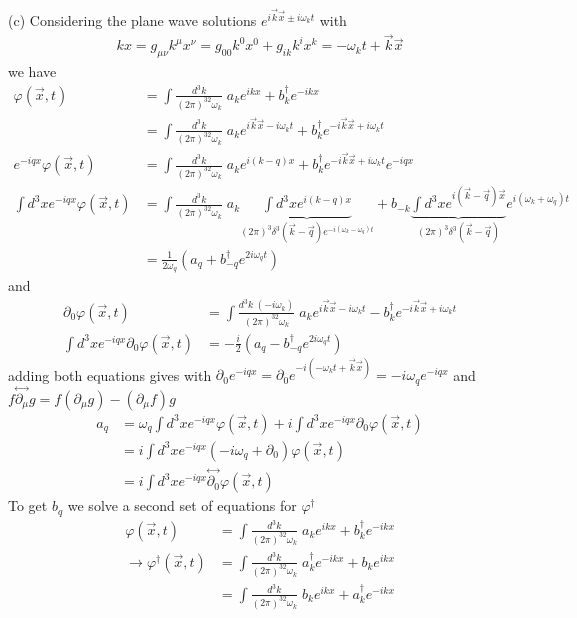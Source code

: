 \documentclass[10pt,a4paper]{article}
\theoremstyle{definition}
\begin{document}
(c) Considering the plane wave solutions $e^{i\vec{k}\vec{x}\pm i\omega_kt}$ with 
\begin{align}
kx=g_{\mu\nu}k^\mu x^\nu=g_{00}k^0x^0+g_{ik}k^ix^k=-\omega_kt+\vec{k}\vec{x}
\end{align}
we have
\begin{align}
\varphi(\vec{x},t)
&=\int\frac{d^3k}{(2\pi)^32\omega_k}\;a_ke^{ikx}+b^\dagger_ke^{-ikx}\\
&=\int\frac{d^3k}{(2\pi)^32\omega_k}\;a_ke^{i\vec{k}\vec{x}-i\omega_kt}+b^\dagger_ke^{-i\vec{k}\vec{x}+i\omega_kt}\\
e^{-iqx}\varphi(\vec{x},t)&=\int\frac{d^3k}{(2\pi)^32\omega_k}\;a_ke^{i(k-q)x}+b^\dagger_ke^{-i\vec{k}\vec{x}+i\omega_kt}e^{-iqx}\\
\int d^3xe^{-iqx}\varphi(\vec{x},t)
&=\int\frac{d^3k}{(2\pi)^32\omega_k} \;a_k\underbrace{\int d^3xe^{i(k-q)x}}_{(2\pi)^3\delta^3(\vec{k}-\vec{q})e^{-i(\omega_k-\omega_q)t}}+b_{-k}\underbrace{\int d^3xe^{i(\vec{k}-\vec{q})\vec{x}}}_{(2\pi)^3\delta^3(\vec{k}-\vec{q})}e^{i(\omega_k+\omega_q)t}\\
&=\frac{1}{2\omega_q}\left(a_q+b^\dagger_{-q}e^{2i\omega_qt}\right)
\end{align}
and
\begin{align}
\partial_0\varphi(\vec{x},t)&=\int\frac{d^3k\;(-i\omega_k)}{(2\pi)^32\omega_k}\;a_ke^{i\vec{k}\vec{x}-i\omega_kt}-b^\dagger_ke^{-i\vec{k}\vec{x}+i\omega_kt}\\
\int d^3x e^{-iqx}\partial_0\varphi(\vec{x},t)&=-\frac{i}{2}\left(a_q-b^\dagger_{-q}e^{2i\omega_qt}\right)
\end{align}
adding both equations gives with $\partial_0e^{-iqx}=\partial_0e^{-i(-\omega_kt+\vec{k}\vec{x})}=-i\omega_qe^{-iqx}$ and $f\stackrel{\leftrightarrow}{\partial_\mu}g=f(\partial_\mu g)-(\partial_\mu f)g$
\begin{align}
a_q&=\omega_q\int d^3x e^{-iqx}\varphi(\vec{x},t)+i\int d^3x e^{-iqx}\partial_0\varphi(\vec{x},t)\\
&=i\int d^3x e^{-iqx}(-i\omega_q+\partial_0)\varphi(\vec{x},t)\\
&=i\int d^3x e^{-iqx}\stackrel{\leftrightarrow}{\partial_0}\varphi(\vec{x},t)
\end{align}
To get $b_q$ we solve a second set of equations for $\varphi^\dagger$ 
\begin{align}
\varphi(\vec{x},t)
&=\int\frac{d^3k}{(2\pi)^32\omega_k}\;a_ke^{ikx}+b^\dagger_ke^{-ikx}\\
\rightarrow\varphi^\dagger(\vec{x},t)
&=\int\frac{d^3k}{(2\pi)^32\omega_k}\;a^\dagger_ke^{-ikx}+b_ke^{ikx}\\
&=\int\frac{d^3k}{(2\pi)^32\omega_k}\;b_ke^{ikx}+a^\dagger_ke^{-ikx}
\end{align}
\end{document}
